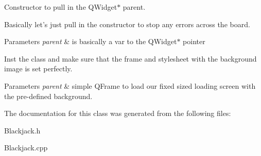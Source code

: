 Constructor to pull in the Q\-Widget$\ast$ parent. 

Basically let's just pull in the constructor to stop any errors across the board. 
\begin{DoxyParams}{Parameters}
{\em parent} & is basically a var to the Q\-Widget$\ast$ pointer\\
\hline
\end{DoxyParams}
Inst the class and make sure that the frame and stylesheet with the background image is set perfectly. 
\begin{DoxyParams}{Parameters}
{\em parent} & simple Q\-Frame to load our fixed sized loading screen with the pre-\/defined background. \\
\hline
\end{DoxyParams}


The documentation for this class was generated from the following files\-:\begin{DoxyCompactItemize}
\item 
Blackjack.\-h\item 
Blackjack.\-cpp\end{DoxyCompactItemize}
